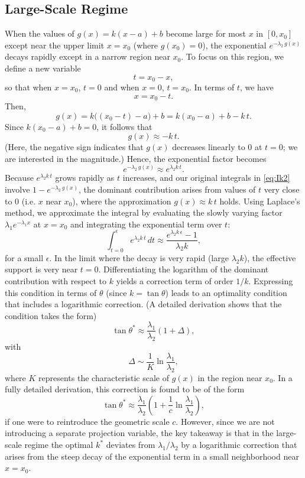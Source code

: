 \subsection{Large-Scale Regime}

When the values of \(g(x) = k(x-a)+b\) become large for most \(x\) in \([0,x_0]\) except near the upper limit \(x=x_0\) (where \(g(x_0)=0\)), the exponential \(e^{-\lambda_2\,g(x)}\) decays rapidly except in a narrow region near \(x_0\). To focus on this region, we define a new variable
\[
t = x_0 - x,
\]
so that when \(x=x_0\), \(t=0\) and when \(x=0\), \(t = x_0\). In terms of \(t\), we have
\[
x = x_0 - t.
\]
Then,
\[
g(x) = k\bigl((x_0-t)-a\bigr)+b = k(x_0-a)+b - k\,t.
\]
Since \(k(x_0-a)+b=0\), it follows that
\[
g(x) \approx -k\,t.
\]
(Here, the negative sign indicates that \(g(x)\) decreases linearly to 0 at \(t=0\); we are interested in the magnitude.) Hence, the exponential factor becomes
\[
e^{-\lambda_2\,g(x)} \approx e^{\lambda_2 k\,t}.
\]
Because \(e^{\lambda_2 k\,t}\) grows rapidly as \(t\) increases, and our original integrals in \eqref{eq:Ik2} involve \(1-e^{-\lambda_2\,g(x)}\), the dominant contribution arises from values of \(t\) very close to 0 (i.e. \(x\) near \(x_0\)), where the approximation \(g(x) \approx k\,t\) holds. Using Laplace's method, we approximate the integral by evaluating the slowly varying factor \( \lambda_1e^{-\lambda_1 x} \) at \(x=x_0\) and integrating the exponential term over \(t\):
\[
\int_{t=0}^{\epsilon} e^{\lambda_2 k\,t}\, dt \approx \frac{e^{\lambda_2 k\,\epsilon}-1}{\lambda_2 k},
\]
for a small \(\epsilon\). In the limit where the decay is very rapid (large \(\lambda_2 k\)), the effective support is very near \(t=0\). Differentiating the logarithm of the dominant contribution with respect to \(k\) yields a correction term of order \(1/k\). Expressing this condition in terms of \(\theta\) (since \(k=\tan\theta\)) leads to an optimality condition that includes a logarithmic correction. (A detailed derivation shows that the condition takes the form)
\[
\tan\theta^* \approx \frac{\lambda_1}{\lambda_2}\left(1+\Delta\right),
\]
with
\[
\Delta \sim \frac{1}{K}\ln\frac{\lambda_1}{\lambda_2},
\]
where \(K\) represents the characteristic scale of \(g(x)\) in the region near \(x_0\). In a fully detailed derivation, this correction is found to be of the form
\[
\tan\theta^* \approx \frac{\lambda_1}{\lambda_2}\left(1+\frac{1}{c}\ln\frac{\lambda_1}{\lambda_2}\right),
\]
if one were to reintroduce the geometric scale \(c\). However, since we are not introducing a separate projection variable, the key takeaway is that in the large-scale regime the optimal \(k^*\) deviates from \(\lambda_1/\lambda_2\) by a logarithmic correction that arises from the steep decay of the exponential term in a small neighborhood near \(x=x_0\).

